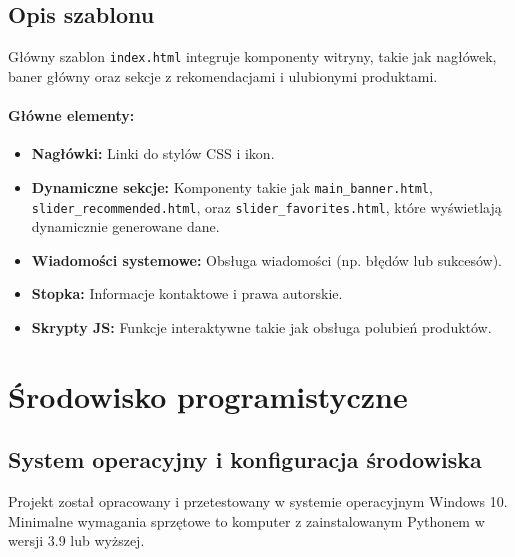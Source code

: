 \documentclass[12pt,a4paper,oneside]{article}
\theoremstyle{definition}
\numberwithin{equation}{section}
\begin{document}
\subsection*{Opis szablonu}
Główny szablon \texttt{index.html} integruje komponenty witryny, takie jak nagłówek, baner główny oraz sekcje z rekomendacjami i ulubionymi produktami. 

\paragraph{Główne elementy:}
\begin{itemize}
    \item \textbf{Nagłówki:} Linki do stylów CSS i ikon.
    \item \textbf{Dynamiczne sekcje:} Komponenty takie jak \texttt{main\_banner.html}, \texttt{slider\_recommended.html}, oraz \texttt{slider\_favorites.html}, które wyświetlają dynamicznie generowane dane.
    \item \textbf{Wiadomości systemowe:} Obsługa wiadomości (np. błędów lub sukcesów).
    \item \textbf{Stopka:} Informacje kontaktowe i prawa autorskie.
    \item \textbf{Skrypty JS:} Funkcje interaktywne takie jak obsługa polubień produktów.
\end{itemize}





\section{Środowisko programistyczne}

\subsection{System operacyjny i konfiguracja środowiska}

Projekt został opracowany i przetestowany w systemie operacyjnym Windows 10. Minimalne wymagania sprzętowe to komputer z zainstalowanym Pythonem w wersji 3.9 lub wyższej.
\end{document}
